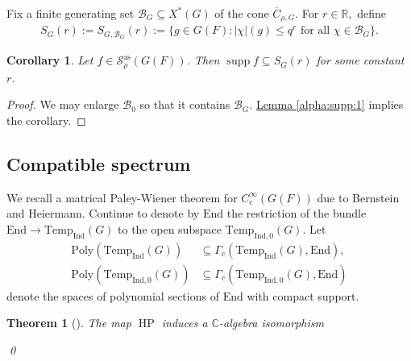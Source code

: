 \documentclass[10pt]{amsart}
\newtheorem{theorem}{Theorem}[section]
\newtheorem{corollary}{Corollary}[theorem]
\theoremstyle{definition}
\numberwithin{equation}{section}
\DeclareMathOperator{\supp}{\mathrm{supp}}
\numberwithin{equation}{subsection}
\newcommand{\Ind}{\mathrm{Ind}}
\newcommand{\RR}{\mathbb{R}}
\newcommand{\calB}{\mathcal{B}}
\newcommand{\Temp}{\mathrm{Temp}}
\newcommand{\HP}{\mathop{\mathrm{HP}}\nolimits}
\begin{document}
Fix a finite generating set $\calB_G\subseteq X^*(G)$ of the cone $\overline{C}_{\rho,G}$. For $r\in \RR,$ define
\begin{align*}
    S_{G}(r):=S_{G,\calB_G}(r):=\{g\in G(F): |\chi|(g)\le q^{r} \text{ for all }\chi\in\calB_G\}.
\end{align*}

\begin{corollary}\label{Sas:f1alpha:polynomial}  Let $f\in \mathcal{S}_\rho^{\mathrm{as}}(G(F))$. Then $\supp f\subseteq S_G(r)$ for some constant $r$.
\end{corollary}
\begin{proof} We may enlarge $\mathcal{B}_0$ so that it contains $\mathcal{B}_G.$ \hyperref[alpha:supp:1]{Lemma \ref{alpha:supp:1}} implies the corollary.
\end{proof}





\subsection{Compatible spectrum} 

We recall a matrical Paley-Wiener theorem for $C_c^\infty(G(F))$ due to Bernstein and Heiermann. Continue to denote by $\mathrm{End}$ the restriction of the bundle $\mathrm{End}\to \Temp_\Ind(G)$ to the open subspace $\Temp_{\Ind,0}(G)$. Let
\begin{align*}
     \mathrm{Poly}(\Temp_{\Ind}(G)) &\subseteq \Gamma_c(\Temp_{\Ind}(G),\mathrm{End}),\\
    \mathrm{Poly}(\Temp_{\Ind,0}(G)) &\subseteq \Gamma_c(\Temp_{\Ind,0}(G),\mathrm{End})
\end{align*}
denote the spaces of polynomial sections of $\mathrm{End}$ with compact support.

\begin{theorem}[\cite{Heiermann:HeckePlan}]\label{BH:PW} The map $\HP$ induces a $\mathbb{C}$-algebra isomorphism
\begin{center}
\end{center}
\qed
\end{theorem}
\end{document}
